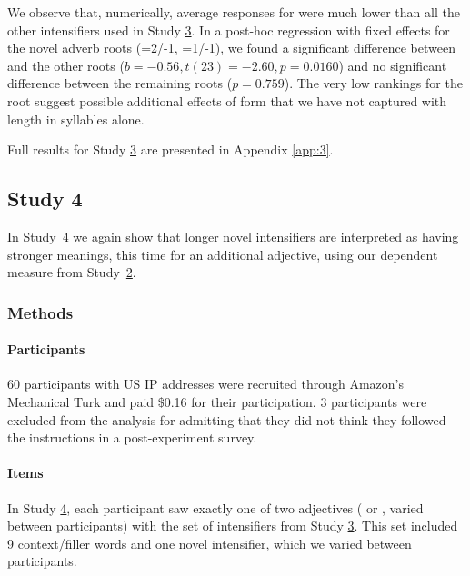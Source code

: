 We observe that, numerically, average responses for  were much lower than all the other intensifiers used in Study \hyperref[sec:study3]{3}.
In a post-hoc regression with fixed effects for the novel adverb roots (=2/-1, =1/-1), we found a significant difference between  and the other roots ($b=-0.56,t(23)=-2.60,p=0.0160$) and no significant difference between the remaining roots ($p=0.759$).
The very low rankings for the root  suggest possible additional effects of form that we have not captured with length in syllables alone.

Full results for Study \hyperref[sec:study3]{3} are presented in Appendix \ref{app:3}.

\subsection{Study 4 \label{sec:study4}}

In Study~\hyperref[sec:study4]{4} we again show that longer novel intensifiers are interpreted as having stronger meanings, this time for an additional adjective, using our dependent measure from Study~\hyperref[sec:study2]{2}.

\subsubsection{Methods}

\paragraph{Participants}
60 participants with US IP addresses were recruited through Amazon's Mechanical Turk and paid \$0.16 for their participation. 3 participants were excluded from the analysis for admitting that they did not think they followed the instructions in a post-experiment survey.

\paragraph{Items}

In Study \hyperref[sec:study4]{4}, each participant saw exactly one of two adjectives ( or , varied between participants) with the set of intensifiers from Study \hyperref[sec:study3]{3}. This set included 9 context/filler words and one novel intensifier, which we varied between participants.

